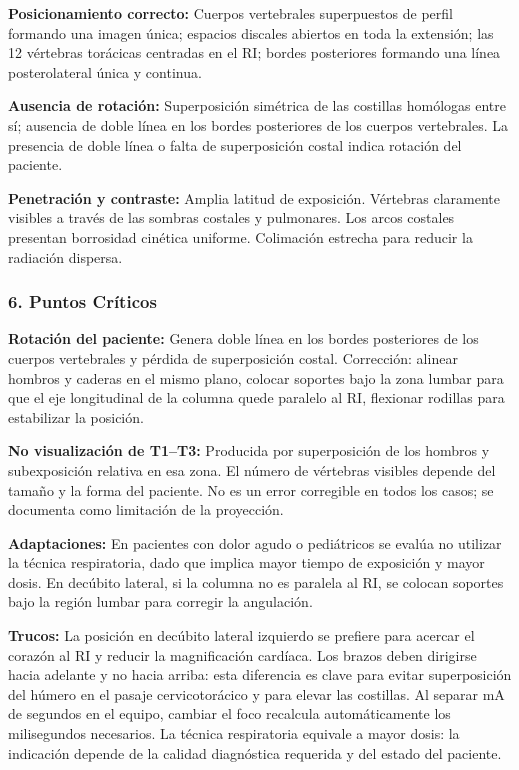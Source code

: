 		\textbf{Posicionamiento correcto:} Cuerpos vertebrales superpuestos de perfil formando una imagen única; espacios discales abiertos en toda la extensión; las 12 vértebras torácicas centradas en el RI; bordes posteriores formando una línea posterolateral única y continua.
		
		\textbf{Ausencia de rotación:} Superposición simétrica de las costillas homólogas entre sí; ausencia de doble línea en los bordes posteriores de los cuerpos vertebrales. La presencia de doble línea o falta de superposición costal indica rotación del paciente.
		
		\textbf{Penetración y contraste:} Amplia latitud de exposición. Vértebras claramente visibles a través de las sombras costales y pulmonares. Los arcos costales presentan borrosidad cinética uniforme. Colimación estrecha para reducir la radiación dispersa.
		
		\subsubsection*{6. Puntos Críticos}
		
		\textbf{Rotación del paciente:} Genera doble línea en los bordes posteriores de los cuerpos vertebrales y pérdida de superposición costal. Corrección: alinear hombros y caderas en el mismo plano, colocar soportes bajo la zona lumbar para que el eje longitudinal de la columna quede paralelo al RI, flexionar rodillas para estabilizar la posición.
		
		\textbf{No visualización de T1--T3:} Producida por superposición de los hombros y subexposición relativa en esa zona. El número de vértebras visibles depende del tamaño y la forma del paciente. No es un error corregible en todos los casos; se documenta como limitación de la proyección.
		
		\textbf{Adaptaciones:} En pacientes con dolor agudo o pediátricos se evalúa no utilizar la técnica respiratoria, dado que implica mayor tiempo de exposición y mayor dosis. En decúbito lateral, si la columna no es paralela al RI, se colocan soportes bajo la región lumbar para corregir la angulación.
		
		\textbf{Trucos:} La posición en decúbito lateral izquierdo se prefiere para acercar el corazón al RI y reducir la magnificación cardíaca. Los brazos deben dirigirse hacia adelante y no hacia arriba: esta diferencia es clave para evitar superposición del húmero en el pasaje cervicotorácico y para elevar las costillas. Al separar mA de segundos en el equipo, cambiar el foco recalcula automáticamente los milisegundos necesarios. La técnica respiratoria equivale a mayor dosis: la indicación depende de la calidad diagnóstica requerida y del estado del paciente.
		
